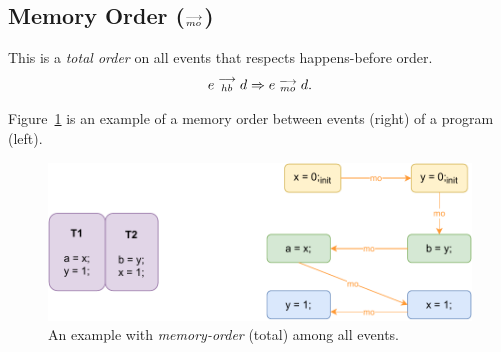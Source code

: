     \subsection{Memory Order ($\stackrel{\longrightarrow}{_{mo}}$)}
        This is a \textit{total order} on all events that respects happens-before order. 
        \begin{align*}
            e\stackrel{\longrightarrow}{_{hb}}d \Rightarrow{} e\stackrel{\longrightarrow}{_{mo}}d.    
        \end{align*}
        
        Figure~\ref{model:memory-order} is an example of a memory order between events (right) of a program (left).
        \begin{figure}[H]
            \centering
            \includegraphics[scale=0.7]{3.ECMAScriptMemoryModel/MemoryOrder.pdf}
            \caption{An example with \textit{memory-order} (total) among all events.}
            \label{model:memory-order}
        \end{figure}
